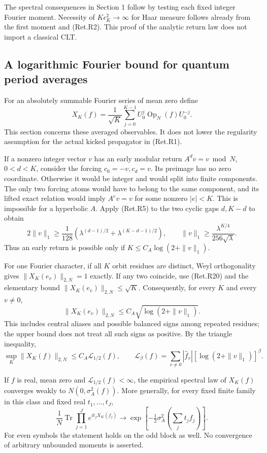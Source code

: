 The spectral consequences in Section 1 follow by testing each fixed
integer Fourier moment. Necessity of \(K\epsilon_K^2\to\infty\) for
Haar measure follows already from the first moment and (Ret.R2).
This proof of the analytic return law does not import a classical CLT.

\hypertarget{a-logarithmic-fourier-bound-for-quantum-period-averages}{%
\subsection{A logarithmic Fourier bound for quantum period averages}\label{a-logarithmic-fourier-bound-for-quantum-period-averages}}

For an absolutely summable Fourier series of mean zero define
\[
 X_K(f)=\frac1{\sqrt K}\sum_{j=0}^{K-1}
                U_0^j\operatorname{Op}_N(f)U_0^{-j}.
\]
This section concerns these averaged observables. It does not lower the
regularity assumption for the actual kicked propagator in (Ret.R1).

If a nonzero integer vector \(v\) has an early modular return
\(A^dv=v\bmod N\), \(0<d<K\), consider the forcing \(c_0=-v,c_d=v\).
Its preimage has no zero coordinate. Otherwise it would be integer
and would split into finite components. The only two forcing atoms
would have to belong to the same component, and its lifted exact
relation would imply \(A^ev=v\) for some nonzero \(|e|<K\).
This is impossible for a hyperbolic \(A\).
Apply (Ret.R5) to the two cyclic gaps \(d,K-d\) to obtain
\[
 2\|v\|_1\ge\frac1{128}
       \left(\lambda^{(d-1)/2}+\lambda^{(K-d-1)/2}\right),
 \qquad
 \|v\|_1\ge\frac{\lambda^{K/4}}{256\sqrt\lambda}.           \tag{Ret.R20}
\]
Thus an early return is possible only if
\(K\le C_A\log(2+\|v\|_1)\).

For one Fourier character, if all \(K\) orbit residues are distinct,
Weyl orthogonality gives \(\|X_K(e_v)\|_{2,N}=1\) exactly.
If any two coincide, use (Ret.R20) and the elementary bound
\(\|X_K(e_v)\|_{2,N}\le\sqrt K\).
Consequently, for every \(K\) and every \(v\ne0\),
\[
 \|X_K(e_v)\|_{2,N}
                      \le C_A\sqrt{\log(2+\|v\|_1)}.       \tag{Ret.R21}
\]
This includes central aliases and possible balanced signs among repeated
residues; the upper bound does not treat all such signs as positive.
By the triangle inequality,
\[
 \sup_K\|X_K(f)\|_{2,N}\le C_A\mathcal L_{1/2}(f),\qquad
 \mathcal L_\beta(f)=
       \sum_{v\ne0}|\widehat f_v|[\log(2+\|v\|_1)]^\beta.  \tag{Ret.R22}
\]

\begin{theorem}\label{pass1:return_phase-2} If \(f\) is real,
mean zero and \(\mathcal L_{1/2}(f)<\infty\), the empirical spectral law
of \(X_K(f)\) converges weakly to \(N(0,\sigma_A^2(f))\).
More generally, for every fixed finite family in this class and fixed
real \(t_1,\ldots,t_J\),
\[
 \frac1N\operatorname{Tr}\prod_{j=1}^J e^{it_jX_K(f_j)}
       \longrightarrow
       \exp\left[-\tfrac12\sigma_A^2\left(\sum_jt_jf_j\right)\right].
                                                               \tag{Ret.R23}
\]
For even symbols the statement holds on the odd block as well.
No convergence of arbitrary unbounded moments is asserted.
\end{theorem}

